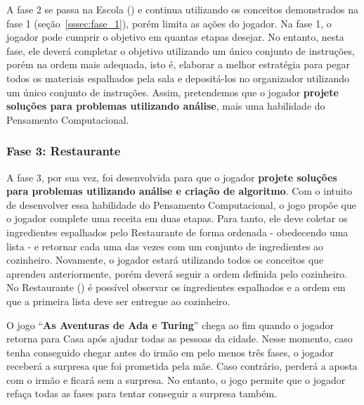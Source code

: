 A fase 2 se passa na Escola () e continua utilizando os conceitos demonstrados na fase 1 (seção~\ref{sssec:fase_1}), porém limita as ações do jogador. Na fase 1, o jogador pode cumprir o objetivo em quantas etapas desejar. No entanto, nesta fase, ele deverá completar o objetivo utilizando um único conjunto de instruções, porém na ordem mais adequada, isto é, elaborar a melhor estratégia para pegar todos os materiais espalhados pela sala e depositá-los no organizador utilizando um único conjunto de instruções. Assim, pretendemos que o jogador \textbf{projete soluções para problemas utilizando análise}, mais uma habilidade do Pensamento Computacional.


\subsubsection{Fase 3: Restaurante} \label{sssec:fase_3}

A fase 3, por sua vez, foi desenvolvida para que o jogador \textbf{projete soluções para problemas utilizando análise e criação de algoritmo}. Com o intuito de desenvolver essa habilidade do Pensamento Computacional, o jogo propõe que o jogador complete uma receita em duas etapas. Para tanto, ele deve coletar os ingredientes espalhados pelo Restaurante de forma ordenada - obedecendo uma lista - e retornar cada uma das vezes com um conjunto de ingredientes ao cozinheiro. Novamente, o jogador estará utilizando todos os conceitos que aprendeu anteriormente, porém deverá seguir a ordem definida pelo cozinheiro. No Restaurante () é possível observar os ingredientes espalhados e a ordem em que a primeira lista deve ser entregue ao cozinheiro.


O jogo “\textbf{As Aventuras de Ada e Turing}” chega ao fim quando o jogador retorna para Casa após ajudar todas as pessoas da cidade. Nesse momento, caso tenha conseguido chegar antes do irmão em pelo menos três fases, o jogador receberá a surpresa que foi prometida pela mãe. Caso contrário, perderá a aposta com o irmão e ficará sem a surpresa. No entanto, o jogo permite que o jogador refaça todas as fases para tentar conseguir a surpresa também. 
